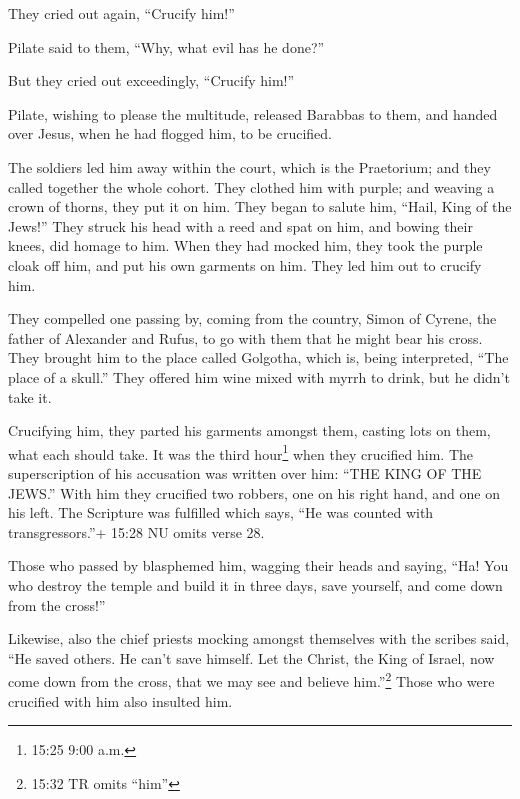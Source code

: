  They cried out again, ``Crucify him!''

 Pilate said to them, ``Why, what evil has he done?''

But they cried out exceedingly, ``Crucify him!''

 Pilate, wishing to please the multitude, released Barabbas
to them, and handed over Jesus, when he had flogged him, to be
crucified.

 The soldiers led him away within the court, which is the
Praetorium; and they called together the whole cohort. 
They clothed him with purple; and weaving a crown of thorns, they put it
on him.  They began to salute him, ``Hail, King of the
Jews!''  They struck his head with a reed and spat on him,
and bowing their knees, did homage to him.  When they had
mocked him, they took the purple cloak off him, and put his own garments
on him. They led him out to crucify him.

 They compelled one passing by, coming from the country,
Simon of Cyrene, the father of Alexander and Rufus, to go with them that
he might bear his cross.  They brought him to the place
called Golgotha, which is, being interpreted, ``The place of a skull.''
 They offered him wine mixed with myrrh to drink, but he
didn't take it.

 Crucifying him, they parted his garments amongst them,
casting lots on them, what each should take.  It was the
third hour\footnote{15:25 9:00 a.m.} when they crucified him.
 The superscription of his accusation was written over him:
``THE KING OF THE JEWS.''  With him they crucified two
robbers, one on his right hand, and one on his left.  The
Scripture was fulfilled which says, ``He was counted with
transgressors.''+ 15:28 NU omits verse 28.

 Those who passed by blasphemed him, wagging their heads
and saying, ``Ha! You who destroy the temple and build it in three days,
 save yourself, and come down from the cross!''

 Likewise, also the chief priests mocking amongst
themselves with the scribes said, ``He saved others. He can't save
himself.  Let the Christ, the King of Israel, now come down
from the cross, that we may see and believe him.''\footnote{15:32 TR
  omits ``him''} Those who were crucified with him also insulted him.

